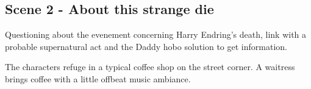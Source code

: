 \subsection{Scene 2 -  About this strange die}

\begin{scene_summary}
Questioning about the evenement concerning Harry Endring's death, link with a probable supernatural act and the Daddy hobo solution to get information.
\end{scene_summary}


\begin{location_description}
The characters refuge in a typical coffee shop on the street corner. A waitress brings coffee  with a little offbeat music ambiance.
\end{location_description}